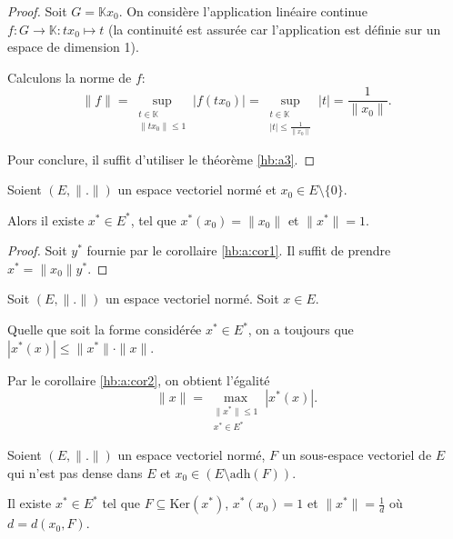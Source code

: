 \begin{proof}
  Soit $G = \mathbb{K}x_0$. On considère l'application
  linéaire continue $f: G\to\mathbb{K}:tx_0\mapsto t$
  (la continuité est assurée car l'application est
  définie sur un espace de dimension 1).

  Calculons la norme de $f$:
  $$\|f\|=\sup_{\substack{t\in\mathbb{K}\\ \|tx_0\|\leq 1}}|f(tx_0)|=
  \sup_{\substack{t\in\mathbb{K}\\ |t|\leq\frac{1}{\|x_0\|}}}|t| =
  \frac{1}{\|x_0\|}.$$

  Pour conclure, il suffit d'utiliser le théorème \ref{hb:a3}.
\end{proof}

\begin{cor}\label{hb:a:cor2}
  Soient $(E, \|.\|)$ un espace vectoriel normé et
  $x_0\in E\setminus\{0\}$.

  Alors il existe $x^*\in E^*$, tel que $x^*(x_0)=\|x_0\|$
  et $\|x^*\|= 1$.
\end{cor}
\begin{proof}
  Soit $y^*$ fournie par le corollaire \ref{hb:a:cor1}.
  Il suffit de prendre $x^*= \|x_0\|y^*$.
\end{proof}

\begin{rem}\label{hb:a:norme}
  Soit $(E, \|.\|)$ un espace vectoriel normé. Soit $x\in E$.

  Quelle que soit la forme considérée $x^*\in E^*$, on a toujours
  que $|x^*(x)|\leq \|x^*\|\cdot \|x\|$.

  Par le corollaire \ref{hb:a:cor2}, on obtient l'égalité
  $$\|x\|=\max_{\substack{\|x^*\|\leq 1 \\ x^*\in E^*}}|x^*(x)|.$$
\end{rem}

\begin{cor}\label{hb:a:cor4}
  Soient $(E, \|.\|)$ un espace vectoriel normé, $F$
  un sous-espace vectoriel de $E$ qui n'est pas
  dense dans $E$ et $x_0\in (E\setminus\mathrm{adh}(F))$.

  Il existe $x^*\in E^*$ tel que $F\subseteq \mathrm{Ker}(x^*)$,
  $x^*(x_0)=1$ et $\|x^*\|=\frac{1}{d}$ où $d = d(x_0, F)$.
\end{cor}

